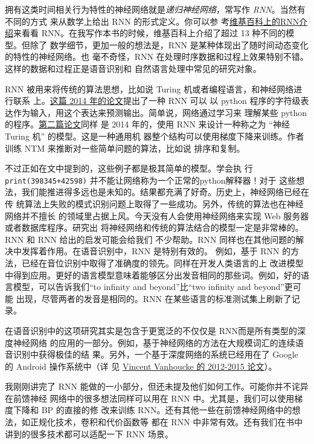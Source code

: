 拥有这类时间相关行为特性的神经网络就是\emph{递归神经网络}，常写作 \emph{RNN}。当然有不同的方式
来从数学上给出 RNN 的形式定义。你可以参
考\href{http://en.wikipedia.org/wiki/Recurrent_neural_network}{维基百科上的RNN介
  绍}来看看 RNN。在我写作本书的时候，维基百科上介绍了超过 13 种不同的模型。但除了
数学细节，更加一般的想法是，RNN 是某种体现出了随时间动态变化的特性的神经网络。也
毫不奇怪，RNN 在处理时序数据和过程上效果特别不错。这样的数据和过程正是语音识别和
自然语言处理中常见的研究对象。

RNN 被用来将传统的算法思想，比如说 Turing 机或者编程语言，和神经网络进行联系
上。\href{http://arxiv.org/abs/1410.4615}{这篇 2014 年的论文}提出了一种 RNN 可以
以 python 程序的字符级表达作为输入，用这个表达来预测输出。简单说，网络通过学习来
理解某些 python 的程序。\href{http://arxiv.org/abs/1410.5401}{第二篇论文}同样
是 2014 年的，使用 RNN 来设计一种称之为 “神经 Turing 机” 的模型。这是一种通用机
器整个结构可以使用梯度下降来训练。作者训练 NTM 来推断对一些简单问题的算法，比如说
排序和复制。

不过正如在文中提到的，这些例子都是极其简单的模型。学会执
行 \lstinline!print(398345+42598)!  并不能让网络称为一个正常的python解释器！对于
这些想法，我们能推进得多远也是未知的。结果都充满了好奇。历史上，神经网络已经在传
统算法上失败的模式识别问题上取得了一些成功。另外，传统的算法也在神经网络并不擅长
的领域里占据上风。今天没有人会使用神经网络来实现 Web 服务器或者数据库程序。研究出
将神经网络和传统的算法结合的模型一定是非常棒的。RNN 和 RNN 给出的启发可能会给我们
不少帮助。RNN 同样也在其他问题的解决中发挥着作用。在语音识别中，RNN 是特别有效的。
例如，基于 RNN 的方法，已经在音位识别中取得了准确度的领先。同样在开发人类语言的上
改进模型中得到应用。更好的语言模型意味着能够区分出发音相同的那些词。例如，好的语
言模型，可以告诉我们“to infinity and beyond”比“two infinity and beyond”更可能
出现，尽管两者的发音是相同的。RNN 在某些语言的标准测试集上刷新了记录。

在语音识别中的这项研究其实是包含于更宽泛的不仅仅是 RNN而是所有类型的深度神经网络
的应用的一部分。例如，基于神经网络的方法在大规模词汇的连续语音识别中获得极佳的结
果。另外，一个基于深度网络的系统已经用在了 Google 的 Android 操作系统中（详
见 \href{http://research.google.com/pubs/VincentVanhoucke.html}{Vincent
  Vanhoucke 的 2012-2015 论文}）。

我刚刚讲完了 RNN 能做的一小部分，但还未提及他们如何工作。可能你并不诧异在前馈神经
网络中的很多想法同样可以用在 RNN 中。尤其是，我们可以使用梯度下降和 BP 的直接的修
改来训练 RNN。还有其他一些在前馈神经网络中的想法，如正规化技术，卷积和代价函数等
都在 RNN 中非常有效。还有我们在书中讲到的很多技术都可以适配一下 RNN 场景。\\

